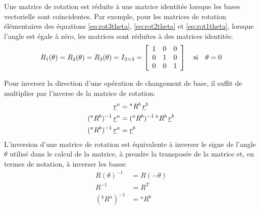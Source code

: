 \begin{property}
Une matrice de rotation est réduite à une matrice identitée lorsque les bases vectorielle sont coïncidentes. Par exemple, pour les matrices de rotation élémentaires des équations \eqref{eq:rot3theta}, \eqref{eq:rot2theta} et \eqref{eq:rot1theta}, lorsque l'angle est égale à zéro, les matrices sont réduites à des matrices identités:
\begin{align}
R_1( \theta ) = R_2( \theta ) = R_3( \theta ) = I_{3\times3} = 
\left[ \begin{array}{c c c}
	1 & 0 & 0 \\
	0 & 1 & 0 \\
	0 & 0 & 1 
\end{array}  \right]  \quad\text{si}\quad \theta = 0
\label{eq:rot3thetaident}
\end{align}
\end{property}


\begin{property}[Inversion]
Pour inverser la direction d'une opération de changement de base, il suffit de multiplier par l'inverse de la matrice de rotation:
\begin{align}
\underline{r}^a &= {}^aR^b \, \underline{r}^b \\
({}^aR^b)^{-1} \, \underline{r}^a &= ({}^aR^b)^{-1} \, {}^aR^b \, \underline{r}^b  \\
({}^aR^b)^{-1} \, \underline{r}^a &= \underline{r}^b
\end{align}
L'inversion d'une matrice de rotation est équivalente à inverser le signe de l'angle $\theta$ utilisé dans le calcul de la matrice, à prendre la transposée de la matrice et, en termes de notation, à inverser les bases:
\begin{align}
R(\theta)^{-1} &= R(-\theta) \\
R^{-1} &= R^T \\
({}^bR^a)^{-1} &= {}^aR^b
\end{align}
\end{property}

